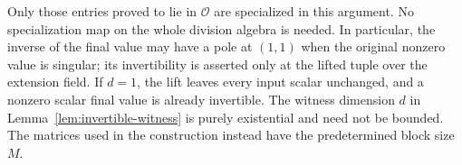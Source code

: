 Only those entries proved to lie in $\mathcal O$ are specialized in
this argument.  No specialization map on the whole division algebra
is needed.  In particular, the inverse of the final value may have
a pole at $(1,1)$ when the original nonzero value is singular; its
invertibility is asserted only at the lifted tuple over the
extension field.  If $d=1$, the lift leaves every input scalar
unchanged, and a nonzero scalar final value is already invertible.
The witness dimension $d$ in Lemma~\ref{lem:invertible-witness} is
purely existential and need not be bounded.  The matrices used in
the construction instead have the predetermined block size $M$.
